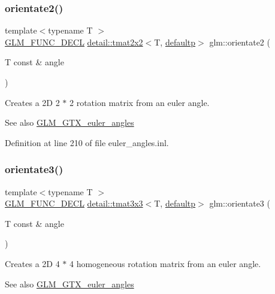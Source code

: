 \subsubsection{\texorpdfstring{orientate2()}{orientate2()}}
{\footnotesize\ttfamily template$<$typename T $>$ \\
\hyperlink{setup_8hpp_ab2d052de21a70539923e9bcbf6e83a51}{G\+L\+M\+\_\+\+F\+U\+N\+C\+\_\+\+D\+E\+CL} \hyperlink{structglm_1_1detail_1_1tmat2x2}{detail\+::tmat2x2}$<$T, \hyperlink{namespaceglm_a0f04f086094c747d227af4425893f545a9d21ccd8b5a009ec7eb7677befc3bf51}{defaultp}$>$ glm\+::orientate2 (\begin{DoxyParamCaption}\item[{T const \&}]{angle }\end{DoxyParamCaption})}

Creates a 2D 2 $\ast$ 2 rotation matrix from an euler angle. \begin{DoxySeeAlso}{See also}
\hyperlink{group__gtx__euler__angles}{G\+L\+M\+\_\+\+G\+T\+X\+\_\+euler\+\_\+angles} 
\end{DoxySeeAlso}


Definition at line 210 of file euler\+\_\+angles.\+inl.

\mbox{\label{group__gtx__euler__angles_ga2c94907d441c40beb413fe3284c1b267}} 
\subsubsection{\texorpdfstring{orientate3()}{orientate3()}\hspace{0.1cm}{\footnotesize\ttfamily [1/2]}}
{\footnotesize\ttfamily template$<$typename T $>$ \\
\hyperlink{setup_8hpp_ab2d052de21a70539923e9bcbf6e83a51}{G\+L\+M\+\_\+\+F\+U\+N\+C\+\_\+\+D\+E\+CL} \hyperlink{structglm_1_1detail_1_1tmat3x3}{detail\+::tmat3x3}$<$T, \hyperlink{namespaceglm_a0f04f086094c747d227af4425893f545a9d21ccd8b5a009ec7eb7677befc3bf51}{defaultp}$>$ glm\+::orientate3 (\begin{DoxyParamCaption}\item[{T const \&}]{angle }\end{DoxyParamCaption})}

Creates a 2D 4 $\ast$ 4 homogeneous rotation matrix from an euler angle. \begin{DoxySeeAlso}{See also}
\hyperlink{group__gtx__euler__angles}{G\+L\+M\+\_\+\+G\+T\+X\+\_\+euler\+\_\+angles} 
\end{DoxySeeAlso}


